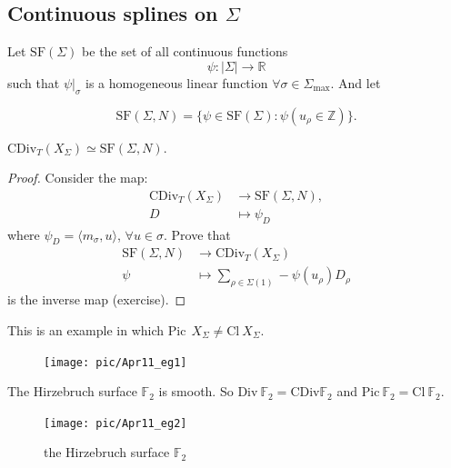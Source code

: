 \documentclass[a4paper,12pt]{amsart}
\newcommand{\ZZ}{\mathbb{Z}}
\newcommand{\RR}{\mathbb{R}}
\newcommand{\FF}{\mathbb{F}}
\newcommand{\CDiv}{\mathrm{CDiv}}
\newcommand{\Picard}{\mathrm{Pic}~}
\newcommand{\Cl}{\mathrm{Cl}~}
\newcommand{\Divisor}{\mathrm{Div}~}
\newcommand{\SplineF}[1]{\mathrm{SF}(#1)}
\begin{document}
\subsection{Continuous splines on $\Sigma$}
\begin{Def}
	 Let $\SplineF{\Sigma}$ be the set of all continuous functions
		\begin{equation*}
		\psi:|\Sigma|\to\RR
		\end{equation*}
		such that $\psi|_{\sigma}$ is a homogeneous linear function $\forall\sigma\in\Sigma_{\max}$. And let
		\item \begin{equation*}
			\SplineF{\Sigma,N}=\{\psi\in\SplineF{\Sigma}:\psi(u_{\rho}\in\ZZ)\}.
		\end{equation*}
\end{Def}
\begin{Proposition}
	$\CDiv_{T}(X_{\Sigma})\simeq\SplineF{\Sigma,N}$.
\end{Proposition}
\begin{proof}Consider the map:
	\begin{align*}
		\CDiv_{T}(X_{\Sigma})&\to\SplineF{\Sigma,N},\\
		D&\mapsto\psi_{D}
	\end{align*}
	where $\psi_{D}=\langle m_\sigma,u\rangle$, $\forall u\in\sigma$. Prove that
	\begin{align*}
		\SplineF{\Sigma,N}&\to\CDiv_{T}(X_{\Sigma})\\
		\psi&\mapsto\sum_{\rho\in\Sigma(1)}-\psi(u_{\rho})D_{\rho}
	\end{align*}
	is the inverse map (exercise).
\end{proof}
\begin{Eg}This is an example in which $\Picard~X_{\Sigma}\neq\Cl X_{\Sigma}$.
		\begin{figure}[h]
			\centering
			\texttt{[image: pic/Apr11\_eg1]}
		\end{figure}
\end{Eg}
\begin{Eg}The Hirzebruch surface $\FF_2$ is smooth. So $\Divisor \FF_2=\CDiv\FF_2$ and $\Picard\FF_2=\Cl\FF_2$.
		\begin{figure}[h]
			\centering
			\texttt{[image: pic/Apr11\_eg2]}
			\caption*{the Hirzebruch surface $\FF_2$}
		\end{figure}
\end{Eg}
\end{document}
